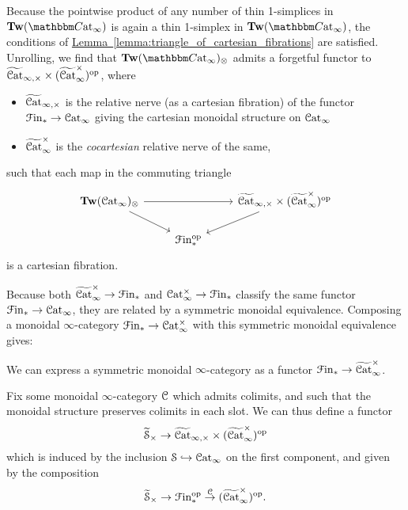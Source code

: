 \documentclass[main.tex]{subfiles}
\begin{document}
Because the pointwise product of any number of thin 1-simplices in $\Tw(\ICCat)$ is again a thin 1-simplex in $\Tw(\ICCat)$, the conditions of \hyperref[lemma:triangle_of_cartesian_fibrations]{Lemma~\ref*{lemma:triangle_of_cartesian_fibrations}} are satisfied. Unrolling, we find that $\Tw(\ICCat)_{\otimes}$ admits a forgetful functor to $\widetilde{\mathcal{C}\mathrm{at}}_{\infty,\times} \times (\widetilde{\mathcal{C}\mathrm{at}}_{\infty}^{\times})^{\mathrm{op}}$, where
\begin{itemize}
  \item $\widetilde{\mathcal{C}\mathrm{at}}_{\infty,\times}$ is the relative nerve (as a cartesian fibration) of the functor $\mathcal{F}\mathrm{in}_{*} \to \mathcal{C}\mathrm{at}_{\infty}$ giving the cartesian monoidal structure on $\mathcal{C}\mathrm{at}_{\infty}$

  \item $\widetilde{\mathcal{C}\mathrm{at}}_{\infty}^{\times}$ is the \emph{cocartesian} relative nerve of the same,
\end{itemize}
such that each map in the commuting triangle
\begin{equation}
  \label{eq:base_triangle}
  \begin{tikzcd}
    \Tw(\ICat)_{\otimes}
    \arrow[rr]
    \arrow[dr]
    && \TICatCart \times (\TICatCocart)\op
    \arrow[dl]
    \\
    & \Finp\op
  \end{tikzcd}
\end{equation}
is a cartesian fibration.

Because both $\widetilde{\mathcal{C}\mathrm{at}}_{\infty}^{\times} \to \mathcal{F}\mathrm{in}_{*}$ and $\mathcal{C}\mathrm{at}_{\infty}^{\times} \to \mathcal{F}\mathrm{in}_{*}$ classify the same functor $\mathcal{F}\mathrm{in}_{*} \to \mathcal{C}\mathrm{at}_{\infty}$, they are related by a symmetric monoidal equivalence. Composing a monoidal $\infty$-category $\mathcal{F}\mathrm{in}_{*} \to \mathcal{C}\mathrm{at}_{\infty}^{\times}$ with this symmetric monoidal equivalence gives:

\begin{proposition}
  We can express a symmetric monoidal $\infty$-category as a functor $\mathcal{F}\mathrm{in}_{*} \to \widetilde{\mathcal{C}\mathrm{at}}_{\infty}^{\times}$.
\end{proposition}

Fix some monoidal $\infty$-category $\mathcal{C}$ which admits colimits, and such that the monoidal structure preserves colimits in each slot. We can thus define a functor
\begin{equation*}
  \widetilde{\mathcal{S}}_{\times} \to \widetilde{\mathcal{C}\mathrm{at}}_{\infty,\times} \times (\widetilde{\mathcal{C}\mathrm{at}}_{\infty}^{\times})^{\mathrm{op}}
\end{equation*}
which is induced by the inclusion $\mathcal{S} \hookrightarrow \mathcal{C}\mathrm{at}_{\infty}$ on the first component, and given by the composition
\begin{equation*}
  \widetilde{\mathcal{S}}_{\times} \to \mathcal{F}\mathrm{in}_{*}^{\mathrm{op}} \overset{\mathcal{C}}{\to} (\widetilde{\mathcal{C}\mathrm{at}}_{\infty}^{\times})^{\mathrm{op}}.
\end{equation*}
\end{document}
